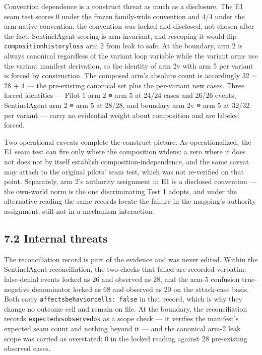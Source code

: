 \documentclass[
  10pt,
]{article}
\renewcommand{\_}{\origunderscore\allowbreak}
\begin{document}
Convention dependence is a construct threat as much as a disclosure. The
E1 seam test scores 0 under the frozen family-wide convention and 4/4
under the arm-native convention; the convention was locked and
disclosed, not chosen after the fact. SentinelAgent scoring is
arm-invariant, and rescoping it would flip
\texttt{composition\_history\_loss} arm 2 from leak to safe. At the
boundary, arm 2 is always canonical regardless of the variant loop
variable while the variant arms use the variant manifest derivation, so
the identity of arm 2v with arm 5 per variant is forced by construction.
The composed arm's absolute count is accordingly 32 = 28 + 4 --- the
pre-existing canonical set plus the per-variant new cases. Three forced
identities --- Pilot 1 arm 2 ≡ arm 5 at 24/24 cases and 26/26 events,
SentinelAgent arm 2 ≡ arm 5 at 28/28, and boundary arm 2v ≡ arm 5 at
32/32 per variant --- carry no evidential weight about composition and
are labeled forced.

Two operational caveats complete the construct picture. As
operationalized, the E1 seam test can fire only where the composition
widens: a zero where it does not does not by itself establish
composition-independence, and the same caveat may attach to the original
pilots' seam test, which was not re-verified on that point. Separately,
arm 2's authority assignment in E1 is a disclosed convention --- the
own-world norm is the one discriminating Test 1 adopts, and under the
alternative reading the same records locate the failure in the mapping's
authority assignment, still not in a mechanism interaction.

\subsection{7.2 Internal threats}\label{internal-threats}

The reconciliation record is part of the evidence and was never edited.
Within the SentinelAgent reconciliation, the two checks that failed are
recorded verbatim: false-denial events locked as 26 and observed as 28,
and the arm-5 confusion true-negative denominator locked as 68 and
observed as 20 on the attack-case basis. Both carry
\texttt{affects\_behavior\_cells:\ false} in that record, which is why
they change no outcome cell and remain on file. At the boundary, the
reconciliation records \texttt{expected\_vs\_observed\_ok} as a scope
check --- it verifies the manifest's expected seam count and nothing
beyond it --- and the canonical arm-2 leak scope was carried as
overstated: 0 in the locked reading against 28 pre-existing observed
cases.
\end{document}
